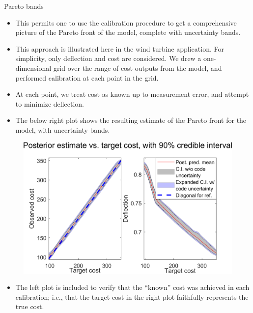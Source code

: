 \documentclass[final]{beamer}
\newlength{\onecolwid}
\begin{document}
\begin{frame}[t]
\begin{columns}[t]
\begin{column}{\onecolwid}
\begin{alertblock}{Pareto bands}
\begin{itemize}
\item This permits one to use the calibration procedure to get a comprehensive picture of the Pareto front of the model, complete with uncertainty bands.

\item This approach is illustrated here in the wind turbine application. For simplicity, only deflection and cost are considered. We drew a one-dimensional grid over the range of cost outputs from the model, and performed calibration at each point in the grid. 

\item At each point, we treat cost as known up to measurement error, and attempt to minimize deflection.

\item The below right plot shows the resulting estimate of the Pareto front for the model, with uncertainty bands.
\end{itemize}

\begin{figure}[h!]
\includegraphics[width=\linewidth]{FIG_cost_grid_pareto_bands}
\label{blade}
\end{figure}

\vspace{-18mm}
\begin{itemize}
\item The left plot is included to verify that the ``known'' cost was achieved in each calibration; i.e., that the target cost in the right plot faithfully represents the true cost.


\end{itemize}



\end{alertblock}


\end{column}
\end{columns}
\end{frame}
\end{document}
